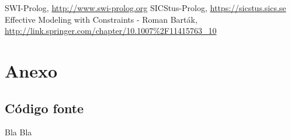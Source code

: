 \documentclass{llncs}
\begin{document}
%
%
\pagebreak
\begin{thebibliography}{5}
%
SWI-Prolog,
\url{http://www.swi-prolog.org}
SICStus-Prolog,
\url{https://sicstus.sics.se}
Effective Modeling with Constraints - Roman Barták,
\url{http://link.springer.com/chapter/10.1007\%2F11415763\_10}

\end{thebibliography}

\section*{Anexo}
\subsection*{Código fonte}

Bla Bla
\end{document}
